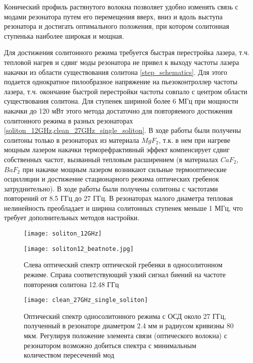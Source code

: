 Конический профиль растянутого волокна позволяет удобно изменять связь с модами резонатора путем его перемещения вверх, вниз и вдоль выступа резонатора и достигать оптимального положения, при котором солитонная ступенька наиболее широкая и мощная.

Для достижения солитонного режима требуется быстрая перестройка лазера, т.ч. тепловой нагрев и сдвиг моды резонатора не привел к выходу частоты лазера накачки из области существования солитона \ref{step_schematics}. Для этого подается однократное пилообразное напряжение на пьезоконтроллер частоты лазера, т.ч. окончание быстрой перестройки частоты совпало с центром области существования солитона. Для ступенек шириной более 6 МГц при мощности накачки до 120 мВт этого метода достаточно для повторяемого достижения солитонного режима в разных резонаторах \ref{soliton_12GHz,clean_27GHz_single_soliton}. В ходе работы были получены солитоны только в резонаторах из материала $MgF_2$, т.к. в нем при нагреве мощным лазером накачки терморефрактивный эффект компенсирует сдвиг собственных частот, вызванный тепловым расширением (в материалах $CaF_2$,$BaF_2$ при накачке мощным лазером возникают сильные термооптические осцилляции и достижение стационарного режима оптических гребенок затруднительно). В ходе работы были получены солитоны с частотами повторений от 8.5 ГГц до 27 ГГц. В резонаторах малого диаметра тепловая нелинейность преобладает и ширина солитонных ступенек меньше 1 МГц, что требует дополнительных методов настройки.

\begin{figure}[ht]
  \begin{minipage}[ht]{0.49\linewidth}\centering
    \texttt{[image: soliton\_12GHz]}
  \end{minipage}
  \hfill
  \begin{minipage}[ht]{0.49\linewidth}\centering
    \texttt{[image: soliton12\_beatnote.jpg]}
  \end{minipage}
  \caption{Слева оптический спектр оптической гребенки в односолитонном режиме. Справа соответствующий узкий сигнал биений на частоте повторения солитона 12.48 ГГц}
  \label{soliton_12GHz}
\end{figure}


\begin{figure}[ht]
\centering
  \texttt{[image: clean\_27GHz\_single\_soliton]}
  \caption{Оптический спектр односолитонного режима с ОСД около 27 ГГц, полученный в резонаторе диаметром 2.4 мм и радиусом кривизны 80 мкм. Регулируя положение элемента связи (оптического волокна) с резонатором возможно добиться спектра с минимальным количеством пересечений мод}
  \label{clean_27GHz_single_soliton}
\end{figure}

